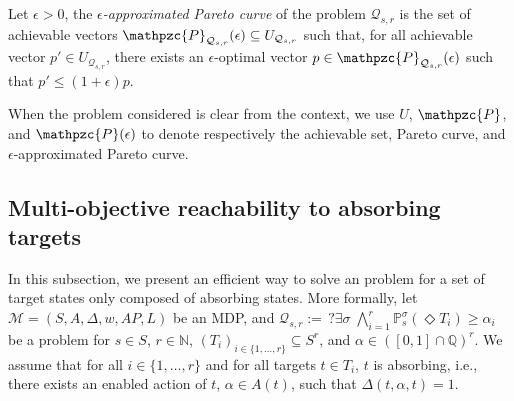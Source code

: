 \begin{definition}
  Let $\epsilon > 0$, the \textit{$\epsilon$-approximated Pareto curve} of the \MOSR{} problem $\mathcal{Q}_{s, r}$ is the set of achievable vectors $\mathpzc{P}_{\mathcal{Q}_{s, r}}(\epsilon) \subseteq U_{\mathcal{Q}_{s, r}}$ such that, for all achievable vector $p' \in U_{\mathcal{Q}_{s, r}}$, there exists an $\epsilon$-optimal vector $p \in \mathpzc{P}_{\mathcal{Q}_{s, r}}(\epsilon)$
  such that $p' \leq (1 + \epsilon) p$.
\end{definition}

\begin{notation}
When the \MOSR{} problem considered is clear from the context, we use $U$, $\mathpzc{P}$, and $\mathpzc{P}(\epsilon)$ to denote respectively the achievable set, Pareto curve, and $\epsilon$-approximated Pareto curve.
\end{notation}

\subsection{Multi-objective reachability to absorbing targets}

In this subsection, we present an efficient way to solve an \MOSR{} problem for a set of target states only composed of absorbing states. More formally, let $\mathcal{M}=(S, A, \Delta, w, AP, L)$ be an MDP, and
$
  \mathcal{Q}_{s, r} := \,?\exists \sigma\; \bigwedge_{i=1}^r \mathbb{P}^\sigma_s(\Diamond T_i) \geq \alpha_i
$
be a \MOSR{} problem for $s \in S$, $r \in \mathbb{N}$, $(T_i)_{i \in \{1, \dots, r\}} \subseteq S^r$, and $\alpha \in ([0, 1] \cap \mathbb{Q})^r$.
We assume that for all $i \in \{ 1, \dots, r\}$ and for all targets $t \in T_i$, $t$ is absorbing, i.e., there exists an enabled action of $t$, $\alpha \in A(t)$, such that $\Delta(t, \alpha, t) = 1$.\\

